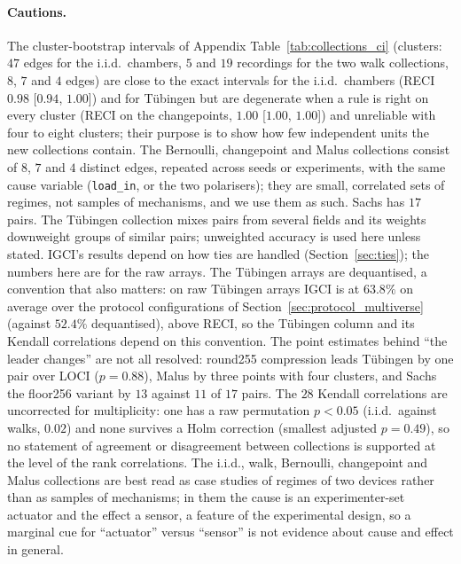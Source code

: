 \paragraph{Cautions.} The cluster-bootstrap intervals of Appendix Table~\ref{tab:collections_ci} (clusters: $47$ edges for the i.i.d.\ chambers, $5$ and $19$ recordings for the two walk collections, $8$, $7$ and $4$ edges) are close to the exact intervals for the i.i.d.\ chambers (RECI $0.98$ [$0.94$, $1.00$]) and for T\"ubingen but are degenerate when a rule is right on every cluster (RECI on the changepoints, $1.00$ [$1.00$, $1.00$]) and unreliable with four to eight clusters; their purpose is to show how few independent units the new collections contain. The Bernoulli, changepoint and Malus collections consist of $8$, $7$ and $4$ distinct edges, repeated across seeds or experiments, with the same cause variable (\texttt{load\_in}, or the two polarisers); they are small, correlated sets of regimes, not samples of mechanisms, and we use them as such. Sachs has $17$ pairs. The T\"ubingen collection mixes pairs from several fields and its weights downweight groups of similar pairs; unweighted accuracy is used here unless stated. IGCI's results depend on how ties are handled (Section~\ref{sec:ties}); the numbers here are for the raw arrays. The T\"ubingen arrays are dequantised, a convention that also matters: on raw T\"ubingen arrays IGCI is at $63.8\%$ on average over the protocol configurations of Section~\ref{sec:protocol_multiverse} (against $52.4\%$ dequantised), above RECI, so the T\"ubingen column and its Kendall correlations depend on this convention. The point estimates behind ``the leader changes'' are not all resolved: round255 compression leads T\"ubingen by one pair over LOCI ($p=0.88$), Malus by three points with four clusters, and Sachs the floor256 variant by $13$ against $11$ of $17$ pairs. The $28$ Kendall correlations are uncorrected for multiplicity: one has a raw permutation $p<0.05$ (i.i.d.\ against walks, $0.02$) and none survives a Holm correction (smallest adjusted $p=0.49$), so no statement of agreement or disagreement between collections is supported at the level of the rank correlations. The i.i.d., walk, Bernoulli, changepoint and Malus collections are best read as case studies of regimes of two devices rather than as samples of mechanisms; in them the cause is an experimenter-set actuator and the effect a sensor, a feature of the experimental design, so a marginal cue for ``actuator'' versus ``sensor'' is not evidence about cause and effect in general.
